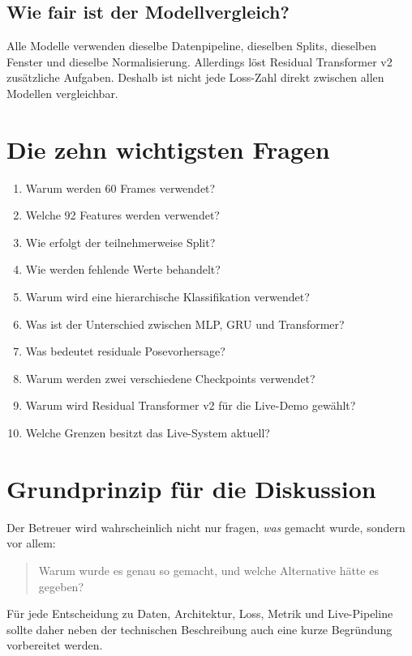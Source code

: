 \documentclass[11pt,a4paper]{article}
\begin{document}
\subsection*{Wie fair ist der Modellvergleich?}
Alle Modelle verwenden dieselbe Datenpipeline, dieselben Splits, dieselben Fenster und dieselbe Normalisierung. Allerdings löst Residual Transformer v2 zusätzliche Aufgaben. Deshalb ist nicht jede Loss-Zahl direkt zwischen allen Modellen vergleichbar.

\section{Die zehn wichtigsten Fragen}
\begin{enumerate}
    \item Warum werden 60 Frames verwendet?
    \item Welche 92 Features werden verwendet?
    \item Wie erfolgt der teilnehmerweise Split?
    \item Wie werden fehlende Werte behandelt?
    \item Warum wird eine hierarchische Klassifikation verwendet?
    \item Was ist der Unterschied zwischen MLP, GRU und Transformer?
    \item Was bedeutet residuale Posevorhersage?
    \item Warum werden zwei verschiedene Checkpoints verwendet?
    \item Warum wird Residual Transformer v2 für die Live-Demo gewählt?
    \item Welche Grenzen besitzt das Live-System aktuell?
\end{enumerate}

\section{Grundprinzip für die Diskussion}
Der Betreuer wird wahrscheinlich nicht nur fragen, \emph{was} gemacht wurde, sondern vor allem:
\begin{quote}
Warum wurde es genau so gemacht, und welche Alternative hätte es gegeben?
\end{quote}
Für jede Entscheidung zu Daten, Architektur, Loss, Metrik und Live-Pipeline sollte daher neben der technischen Beschreibung auch eine kurze Begründung vorbereitet werden.
\end{document}
